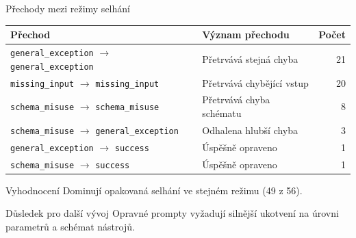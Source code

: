 \documentclass[aspectratio=169,11pt]{beamer}
\begin{document}
\begin{frame}[t]{Přechody mezi režimy selhání}
  \small
  \begin{table}
    \centering
    \begin{tabular}{@{}llr@{}}
      \toprule
      \textbf{Přechod} & \textbf{Význam přechodu} & \textbf{Počet} \\
      \midrule
      \texttt{general\_exception} $\rightarrow$ \texttt{general\_exception}
        & Přetrvává stejná chyba & 21 \\
      \texttt{missing\_input} $\rightarrow$ \texttt{missing\_input}
        & Přetrvává chybějící vstup & 20 \\
      \texttt{schema\_misuse} $\rightarrow$ \texttt{schema\_misuse}
        & Přetrvává chyba schématu & 8 \\
      \texttt{schema\_misuse} $\rightarrow$ \texttt{general\_exception}
        & Odhalena hlubší chyba & 3 \\
      \texttt{general\_exception} $\rightarrow$ \texttt{success}
        & Úspěšně opraveno & 1 \\
      \texttt{schema\_misuse} $\rightarrow$ \texttt{success}
        & Úspěšně opraveno & 1 \\
      \bottomrule
    \end{tabular}
  \end{table}

  \begin{alertblock}{Vyhodnocení}
    Dominují opakovaná selhání ve stejném režimu (49 z 56).
  \end{alertblock}

  \begin{block}{Důsledek pro další vývoj}
    Opravné prompty vyžadují silnější ukotvení na úrovni parametrů a schémat
    nástrojů.
  \end{block}
\end{frame}
\end{document}
